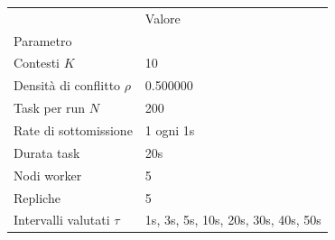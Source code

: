 \begin{tabular}{ll}
\toprule
 & Valore \\
Parametro &  \\
\midrule
Contesti $K$ & 10 \\
Densità di conflitto $\rho$ & 0.500000 \\
Task per run $N$ & 200 \\
Rate di sottomissione & 1 ogni 1s \\
Durata task & 20s \\
Nodi worker & 5 \\
Repliche & 5 \\
Intervalli valutati $\tau$ & 1s, 3s, 5s, 10s, 20s, 30s, 40s, 50s \\
\bottomrule
\end{tabular}
